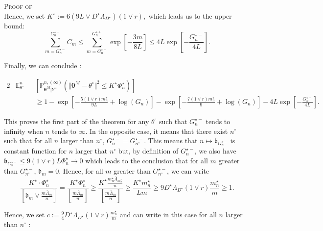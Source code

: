 \begin{pro}{\textsc{Proof of } \\}
Hence, we set $K^{\star} := 6 \left(9L \vee D^{\star} \Lambda_{D^{\star}}\right) \left(1 \vee r\right),$ which leads us to the upper bound:
\[\sum\limits_{m = G_{n}^{\star-}}^{G_{n}^{\star+}}C_{m} \leq \sum\limits_{m = G_{n}^{\star-}}^{G_{n}^{\star+}} \exp\left[- \frac{3 m}{8 L}\right] \leq 4 L \exp\left[-\frac{G_{n}^{\star-}}{4 L}\right].\]

\bigskip

Finally, we can conclude :

\begin{alignat*}{2}
& \mathds{E}_{\theta^{\circ}}^{n} && \left[\mathds{P}_{\boldsymbol{\theta}^{M}\vert Y^{n}}^{n, (\infty)}\left(\Vert \boldsymbol{\theta}^{M} - \theta^{\circ} \Vert ^{2} \leq K^{\star} \Phi_{n}^{\star}\right)\right]\\
& && \geq 1 - \exp\left[- \frac{5 (1 \vee r) m_{n}^{\star}}{9 L} + \log\left(G_{n}\right)\right] - \exp\left[- \frac{7 (1 \vee r) m_{n}^{\star}}{9} + \log\left(G_{n}\right)\right] - 4 L \exp\left[- \frac{G_{n}^{\star-}}{4L}\right].
\end{alignat*}

This proves the first part of the theorem for any $\theta^{\circ}$ such that $G_{n}^{\star-}$ tends to infinity when $n$ tends to $\infty$.
In the opposite case, it means that there exist $n^{\circ}$ such that for all $n$ larger than $n^{\circ}$, $G_{n}^{\star-} = G_{n^{\circ}}^{\star-}.$
This means that $n \mapsto \mathfrak{b}_{G_{n}^{\star-}}$ is constant function for $n$ larger that $n^{\circ}$ but, by definition of $G_{n}^{\star-}$, we also have $\mathfrak{b}_{G_{n}^{\star-}} \leq 9 \left(1 \vee r\right) L \Phi_{n}^{\star} \rightarrow 0$ which leads to the conclusion that for all $m$ greater than $G_{n^{\circ}}^{\star-}$, $\mathfrak{b}_{m} = 0.$
Hence, for all $m$ greater than $G_{n^{\circ}}^{\star-}$, we can write
\[\frac{K^{\star} \cdot \Phi_{n}^{\star}}{\left[\mathfrak{b}_{m} \vee \frac{m \overline{\Lambda}_{m}}{n} \right]} = \frac{ K^{\star} \Phi_{n}^{\star}}{\left[\frac{m \overline{\Lambda}_{m}}{n} \right]} \geq \frac{K^{\star} \frac{m_{n}^{\star} \overline{\Lambda}_{m_{n}^{\star}}}{n}}{\left[\frac{m \overline{\Lambda}_{m}}{n} \right]} \geq \frac{K^{\star} m_{n}^{\star}}{L m} \geq 9 D^{\star} \Lambda_{D^{\star}} \left(1 \vee r\right) \frac{m_{n}^{\star}}{m} \geq 1.\]

Hence, we set $c := \frac{9}{4} D^{\star} \Lambda_{D^{\star}} \left(1 \vee r\right) \frac{m_{n}^{\star}}{m}$ and can write in this case for all $n$ larger than $n^{\circ}$ :


\end{pro}

